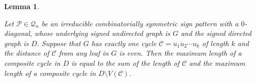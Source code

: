 \documentclass[a4paper, 10pt]{article}
\newtheorem{lemma}{Lemma}[section]
\numberwithin{equation}{section}
\begin{document}
\begin{lemma}\label{l28}
	
	Let $\mathcal{P}\in \mathcal{Q}_n$ be an irreducible combinatorially symmetric sign pattern with a $0$-diagonal, whose underlying signed undirected graph is $G$ and the signed directed graph is $D$. Suppose that $G$ has exactly one cycle $\mathcal{C}=u_1u_2\cdots u_k$ of length $k$ and the distance of $\mathcal{C}$ from any leaf in $G$ is even. Then the maximum length of a composite cycle in $D$ is equal to the sum of the length of $\mathcal{C}$ and the maximum length of a composite cycle in $D\setminus V(\mathcal{C})$.       
\end{lemma}
\end{document}
